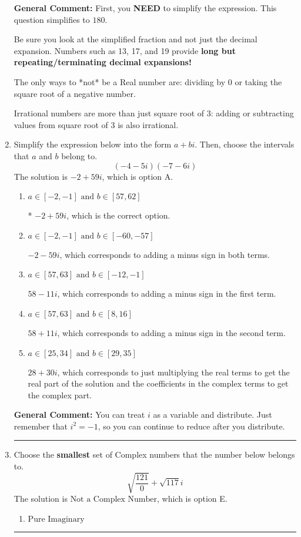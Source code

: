\documentclass{extbook}[14pt]
\newcommand{\litem}[1]{\item #1

\rule{\textwidth}{0.4pt}}
\begin{document}
\begin{enumerate}
{\textbf{General Comment:} First, you \textbf{NEED} to simplify the expression. This question simplifies to $180$. 
 
 Be sure you look at the simplified fraction and not just the decimal expansion. Numbers such as 13, 17, and 19 provide \textbf{long but repeating/terminating decimal expansions!} 
 
 The only ways to *not* be a Real number are: dividing by 0 or taking the square root of a negative number. 
 
 Irrational numbers are more than just square root of 3: adding or subtracting values from square root of 3 is also irrational.
}
\litem{
Simplify the expression below into the form $a+bi$. Then, choose the intervals that $a$ and $b$ belong to.
\[ (-4 - 5 i)(-7 - 6 i) \]The solution is \( -2 + 59 i \), which is option A.\begin{enumerate}[label=\Alph*.]
\item \( a \in [-2, -1] \text{ and } b \in [57, 62] \)

* $-2 + 59 i$, which is the correct option.
\item \( a \in [-2, -1] \text{ and } b \in [-60, -57] \)

 $-2 - 59 i$, which corresponds to adding a minus sign in both terms.
\item \( a \in [57, 63] \text{ and } b \in [-12, -1] \)

 $58 - 11 i$, which corresponds to adding a minus sign in the first term.
\item \( a \in [57, 63] \text{ and } b \in [8, 16] \)

 $58 + 11 i$, which corresponds to adding a minus sign in the second term.
\item \( a \in [25, 34] \text{ and } b \in [29, 35] \)

 $28 + 30 i$, which corresponds to just multiplying the real terms to get the real part of the solution and the coefficients in the complex terms to get the complex part.
\end{enumerate}

\textbf{General Comment:} You can treat $i$ as a variable and distribute. Just remember that $i^2=-1$, so you can continue to reduce after you distribute.
}
\litem{
Choose the \textbf{smallest} set of Complex numbers that the number below belongs to.
\[ \sqrt{\frac{121}{0}}+\sqrt{117} i \]The solution is \( \text{Not a Complex Number} \), which is option E.\begin{enumerate}[label=\Alph*.]
\item \( \text{Pure Imaginary} \)


\end{enumerate}}
\end{enumerate}
\end{document}
